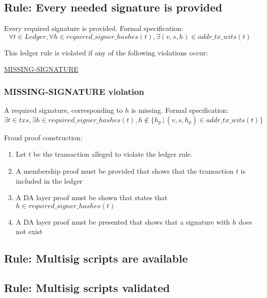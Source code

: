 \documentclass[../midgard.tex]{subfiles}
\begin{document}
\subsection{Rule: Every needed signature is provided}
\label{rule:every-needed-signature-is-provided}
Every required signature is provided.
Formal specification:
\begin{equation*}
    \forall t \in Ledger, \forall h \in required\_signer\_hashes(t), \exists (v, s, h) \in addr\_tx\_wits(t)
\end{equation*}
        
This ledger rule is violated if any of the following violations occur:
\begin{itemize-multi}
  \item \hyperref[violation:MISSING-SIGNATURE]{MISSING-SIGNATURE}
\end{itemize-multi}

\subsubsection{MISSING-SIGNATURE violation}
\label{violation:MISSING-SIGNATURE}
A required signature, corresponding to $h$ is missing.
Formal specification:
\begin{equation*}
    \exists t \in txs, \exists h \in required\_signer\_hashes(t), h \notin \{ h_p \, | \, (v, s, h_p) \in addr\_tx\_wits(t) \}
\end{equation*}

Fraud proof construction:
\begin{enumerate}
  \item Let $t$ be the transaction alleged to violate the ledger rule. 
  \item A membership proof must be provided that shows that the transaction $t$ is included in the ledger
  \item A DA layer proof must be shown that states that $h \in required\_signer\_hashes(t)$
  \item A DA layer proof must be presented that shows that a signature with $h$ does not exist
\end{enumerate}

\subsection{Rule: Multisig scripts are available}
\label{rule:multisig-scripts-are-available}

\subsection{Rule: Multisig scripts validated}
\label{rule:multisig-scripts-validated}
\end{document}
